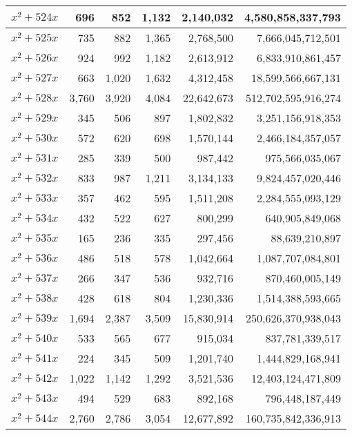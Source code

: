 \documentclass[a4paper]{amsproc}
\theoremstyle{plain}
\theoremstyle{named}
\begin{document}
\begin{longtable}{ | l | r | r | r | r | r | }
$x^2 + 524x$ & 696 & 852 & 1{,}132 & 2{,}140{,}032 & 4{,}580{,}858{,}337{,}793 \\ \hline
$x^2 + 525x$ & 735 & 882 & 1{,}365 & 2{,}768{,}500 & 7{,}666{,}045{,}712{,}501 \\ \hline
$x^2 + 526x$ & 924 & 992 & 1{,}182 & 2{,}613{,}912 & 6{,}833{,}910{,}861{,}457 \\ \hline
$x^2 + 527x$ & 663 & 1{,}020 & 1{,}632 & 4{,}312{,}458 & 18{,}599{,}566{,}667{,}131 \\ \hline
$x^2 + 528x$ & 3{,}760 & 3{,}920 & 4{,}084 & 22{,}642{,}673 & 512{,}702{,}595{,}916{,}274 \\ \hline
$x^2 + 529x$ & 345 & 506 & 897 & 1{,}802{,}832 & 3{,}251{,}156{,}918{,}353 \\ \hline
$x^2 + 530x$ & 572 & 620 & 698 & 1{,}570{,}144 & 2{,}466{,}184{,}357{,}057 \\ \hline
$x^2 + 531x$ & 285 & 339 & 500 & 987{,}442 & 975{,}566{,}035{,}067 \\ \hline
$x^2 + 532x$ & 833 & 987 & 1{,}211 & 3{,}134{,}133 & 9{,}824{,}457{,}020{,}446 \\ \hline
$x^2 + 533x$ & 357 & 462 & 595 & 1{,}511{,}208 & 2{,}284{,}555{,}093{,}129 \\ \hline
$x^2 + 534x$ & 432 & 522 & 627 & 800{,}299 & 640{,}905{,}849{,}068 \\ \hline
$x^2 + 535x$ & 165 & 236 & 335 & 297{,}456 & 88{,}639{,}210{,}897 \\ \hline
$x^2 + 536x$ & 486 & 518 & 578 & 1{,}042{,}664 & 1{,}087{,}707{,}084{,}801 \\ \hline
$x^2 + 537x$ & 266 & 347 & 536 & 932{,}716 & 870{,}460{,}005{,}149 \\ \hline
$x^2 + 538x$ & 428 & 618 & 804 & 1{,}230{,}336 & 1{,}514{,}388{,}593{,}665 \\ \hline
$x^2 + 539x$ & 1{,}694 & 2{,}387 & 3{,}509 & 15{,}830{,}914 & 250{,}626{,}370{,}938{,}043 \\ \hline
$x^2 + 540x$ & 533 & 565 & 677 & 915{,}034 & 837{,}781{,}339{,}517 \\ \hline
$x^2 + 541x$ & 224 & 345 & 509 & 1{,}201{,}740 & 1{,}444{,}829{,}168{,}941 \\ \hline
$x^2 + 542x$ & 1{,}022 & 1{,}142 & 1{,}292 & 3{,}521{,}536 & 12{,}403{,}124{,}471{,}809 \\ \hline
$x^2 + 543x$ & 494 & 529 & 683 & 892{,}168 & 796{,}448{,}187{,}449 \\ \hline
$x^2 + 544x$ & 2{,}760 & 2{,}786 & 3{,}054 & 12{,}677{,}892 & 160{,}735{,}842{,}336{,}913 \\ \hline

\end{longtable}
\end{document}
